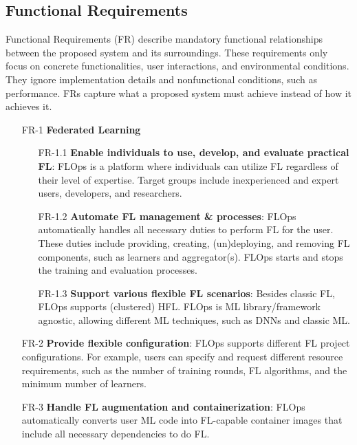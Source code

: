 \subsection{Functional Requirements}
Functional Requirements (FR) describe mandatory functional relationships between the proposed system and its surroundings.
These requirements only focus on concrete functionalities, user interactions, and environmental conditions.
They ignore implementation details and nonfunctional conditions, such as performance.
FRs capture what a proposed system must achieve instead of how it achieves it. \cite{book:bruegge}

\begin{itemize}
    \item [FR-1] {\textbf{Federated Learning}} \label{FR-1}
        \begin{itemize}
        \item [FR-1.1] \textbf{Enable individuals to use, develop, and evaluate practical FL}: \label{FR-1.1}
            FLOps is a platform where individuals can utilize FL regardless of their level of expertise.
            Target groups include inexperienced and expert users, developers, and researchers.
        \item [FR-1.2] \textbf{Automate FL management \& processes}: \label{FR-1.2}
            FLOps automatically handles all necessary duties to perform FL for the user.
            These duties include providing, creating, (un)deploying, and removing FL components, such as learners and aggregator(s).
            FLOps starts and stops the training and evaluation processes.
        \item [FR-1.3] \textbf{Support various flexible FL scenarios}: \label{FR-1.3}
            Besides classic FL, FLOps supports (clustered) HFL.
            FLOps is ML library/framework agnostic, allowing different ML techniques, such as DNNs and classic ML.
        \end{itemize}
    \item [FR-2] {\textbf{Provide flexible configuration}}: \label{FR-2}
        FLOps supports different FL project configurations.
        For example, users can specify and request different resource requirements, such as the number of training rounds, FL algorithms, and the minimum number of learners.
    \item [FR-3] {\textbf{Handle FL augmentation and containerization}}: \label{FR-3}
        FLOps automatically converts user ML code into FL-capable container images that include all necessary dependencies to do FL.

\end{itemize}
